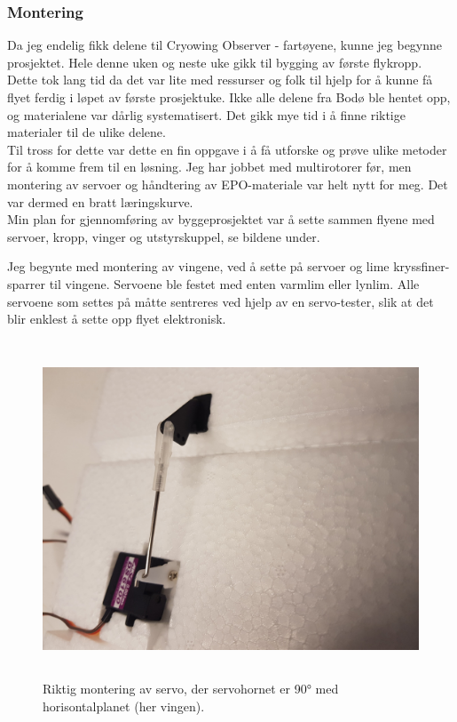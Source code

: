 \documentclass[12pt, a4paper]{article}
\begin{document}
\subsubsection{Montering}
Da jeg endelig fikk delene til Cryowing Observer - fartøyene, kunne jeg begynne prosjektet. Hele denne uken og neste uke gikk til bygging av første flykropp. Dette tok lang tid da det var lite med ressurser og folk til hjelp for å kunne få flyet ferdig i løpet av første prosjektuke. Ikke alle delene fra Bodø ble hentet opp, og materialene var dårlig systematisert. Det gikk mye tid i å finne riktige materialer til de ulike delene.\\
Til tross for dette var dette en fin oppgave i å få utforske og prøve ulike metoder for å komme frem til en løsning. Jeg har jobbet med multirotorer før, men montering av servoer og håndtering av EPO-materiale var helt nytt for meg. Det var dermed en bratt læringskurve. \\ Min plan for gjennomføring av byggeprosjektet var å sette sammen flyene med servoer, kropp, vinger og utstyrskuppel, se bildene under.

Jeg begynte med montering av vingene, ved å sette på servoer og lime kryssfiner-sparrer til vingene. Servoene ble festet med enten varmlim eller lynlim. Alle servoene som settes på måtte sentreres ved hjelp av en servo-tester, slik at det blir enklest å sette opp flyet elektronisk. 

\begin{figure}[ht]
	\centering
	\includegraphics[height = 10cm, width = .6\textwidth]{bilder/servomontering.jpg}
	\caption[Servoorientering]{Riktig montering av servo, der servohornet er \ang{90} med horisontalplanet (her vingen).}
\end{figure}
\end{document}
